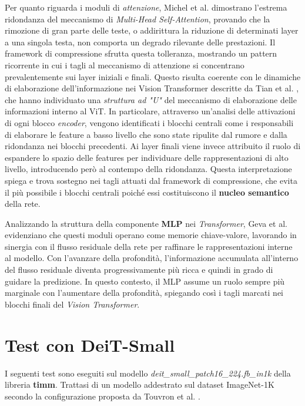 Per quanto riguarda i moduli di \textit{attenzione}, Michel et al.
\cite{michel2019sixteen} dimostrano l'estrema ridondanza del meccanismo di
\textit{Multi-Head Self-Attention}, provando che la rimozione di gran parte
delle teste, o addirittura la riduzione di determinati layer a una singola
testa, non comporta un degrado rilevante delle prestazioni. Il framework di
compressione sfrutta questa tolleranza, mostrando un pattern ricorrente in cui
i tagli al meccanismo di attenzione si concentrano prevalentemente sui layer
iniziali e finali. Questo risulta coerente con le dinamiche di elaborazione
dell'informazione nei Vision Transformer descritte da Tian et al.
\cite{tian2025distillationdynamicsunderstandingfeaturebased}, che hanno
individuato una \textit{struttura ad "U"} del meccanismo di elaborazione delle
informazioni interno al ViT. In particolare, attraverso un'analisi delle
attivazioni di ogni blocco \textit{encoder}, vengono identificati i blocchi
centrali come i responsabili di elaborare le feature a basso livello che sono
state ripulite dal rumore e dalla ridondanza nei blocchi precedenti. Ai layer
finali viene invece attribuito il ruolo di espandere lo spazio delle features
per individuare delle rappresentazioni di alto livello, introducendo però al
contempo della ridondanza. Questa interpretazione spiega e trova sostegno nei
tagli attuati dal framework di compressione, che evita il più possibile i
blocchi centrali poiché essi costituiscono il \textbf{nucleo semantico} della
rete.\par
Analizzando la struttura della componente \textbf{MLP} nei
\textit{Transformer}, Geva et al. \cite{geva2021transformer} evidenziano che
questi moduli operano come memorie chiave-valore, lavorando in sinergia con il
flusso residuale della rete per raffinare le rappresentazioni interne al
modello. Con l'avanzare della profondità, l'informazione accumulata all'interno
del flusso residuale diventa progressivamente più ricca e quindi in grado di
guidare la predizione. In questo contesto, il MLP assume un ruolo sempre più
marginale con l'aumentare della profondità, spiegando così i tagli marcati nei blocchi finali del \textit{Vision Transformer}.
\section{Test con DeiT-Small}
I seguenti test sono eseguiti sul modello
\textit{deit\_small\_patch16\_224.fb\_in1k} della libreria \textbf{timm}.
Trattasi di un modello addestrato sul dataset ImageNet-1K secondo la
configurazione proposta da Touvron et al.
\cite{touvron2021trainingdataefficientimagetransformers}.
